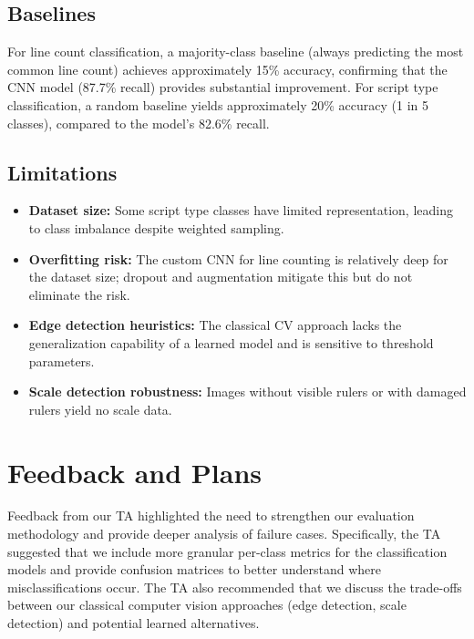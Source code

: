 \documentclass[11pt]{article}
\begin{document}
\subsection{Baselines}

For line count classification, a majority-class baseline (always predicting the most common line count) achieves approximately 15\% accuracy, confirming that the CNN model (87.7\% recall) provides substantial improvement.
For script type classification, a random baseline yields approximately 20\% accuracy (1 in 5 classes), compared to the model's 82.6\% recall.

\subsection{Limitations}

\begin{itemize}
  \item \textbf{Dataset size:} Some script type classes have limited representation, leading to class imbalance despite weighted sampling.
  \item \textbf{Overfitting risk:} The custom CNN for line counting is relatively deep for the dataset size; dropout and augmentation mitigate this but do not eliminate the risk.
  \item \textbf{Edge detection heuristics:} The classical CV approach lacks the generalization capability of a learned model and is sensitive to threshold parameters.
  \item \textbf{Scale detection robustness:} Images without visible rulers or with damaged rulers yield no scale data.
\end{itemize}

\section{Feedback and Plans}

Feedback from our TA highlighted the need to strengthen our evaluation methodology and provide deeper analysis of failure cases.
Specifically, the TA suggested that we include more granular per-class metrics for the classification models and provide confusion matrices to better understand where misclassifications occur.
The TA also recommended that we discuss the trade-offs between our classical computer vision approaches (edge detection, scale detection) and potential learned alternatives.
\end{document}
